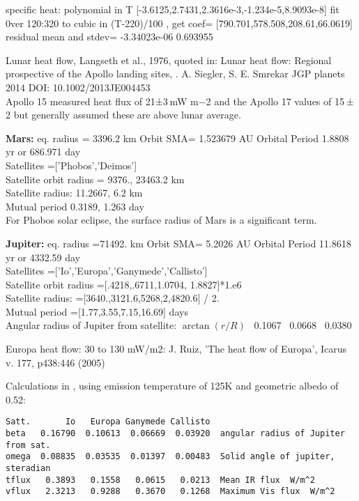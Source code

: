 \documentclass{article}
\begin{document}
specific heat: polynomial in T [-3.6125,2.7431,2.3616e-3,-1.234e-5,8.9093e-8]
\qi fit 0ver 120:320 to cubic in (T-220)/100 , get coef= [790.701,578.508,208.61,66.0619]
\qi residual mean and stdev= -3.34023e-06     0.693955

Lunar heat flow, Langseth et al., 1976, quoted in:
\qi  Lunar heat flow: Regional prospective of the Apollo landing sites, 
\qii . A. Siegler, S. E. Smrekar  JGP planets 2014 DOI: 10.1002/2013JE004453
\\ Apollo 15 measured heat flux of 21±3 mW m−2 and the Apollo 17 values of 15 ± 2
\qi but generally assumed these are above lunar average.

\textbf{Mars:} eq. radius = 3396.2 km
\qi Orbit SMA= 1.523679 AU
\qi Orbital Period 1.8808 yr or 686.971 day
\\ Satellites =['Phobos','Deimos']
\\ Satellite orbit radius = 9376.,  23463.2 km
\\ Satellite radius: 11.2667, 6.2   km 
\\ Mutual period  0.3189, 1.263   day
\\ For Phobos solar eclipse, the surface radius of Mars is a significant term.

\textbf{Jupiter:} eq. radius =71492. km
\qi Orbit SMA= 5.2026 AU
\qi Orbital Period 11.8618 yr or 4332.59 day
\\ Satellites =['Io','Europa','Ganymede','Callisto']
\\ Satellite orbit radius =[.4218,.6711,1.0704, 1.8827]*1.e6
\\ Satellite radius: =[3640.,3121.6,5268,2,4820.6] / 2.
\\ Mutual period =[1.77,3.55,7.15,16.69] days
\\ Angular radius of Jupiter from satellite: $\arctan(r/R)$
  \   0.1067 \   0.0668  \  0.0380

Europa heat flow: 30 to 130 mW/m2: J. Ruiz, 'The heat flow of Europa', Icarus v. 177, p438:446 (2005) 

Calculations in , using emission temperature of 125K and 
geometric albedo of 0.52:
\vspace{-3.mm} 
\begin{verbatim}
Satt.       Io   Europa Ganymede Callisto 
beta   0.16790  0.10613  0.06669  0.03920  angular radius of Jupiter from sat.
omega  0.08835  0.03535  0.01397  0.00483  Solid angle of jupiter, steradian
tflux   0.3893   0.1558   0.0615   0.0213  Mean IR flux  W/m^2
vflux   2.3213   0.9288   0.3670   0.1268  Maximum Vis flux  W/m^2
\end{verbatim}
\end{document}
